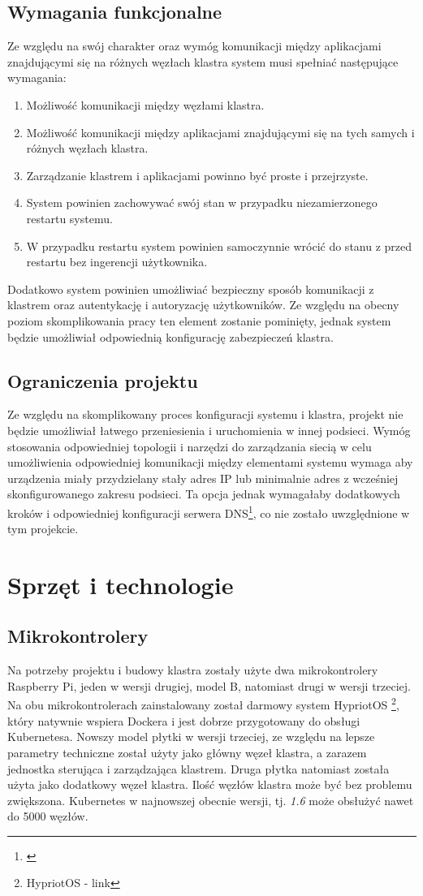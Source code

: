 \documentclass[12pt]{report}
\let\Oldsection\section
\renewcommand{\section}{\FloatBarrier\Oldsection}
\let\Oldsubsection\subsection
\renewcommand{\subsection}{\FloatBarrier\Oldsubsection}
\begin{document}
{\subsection{Wymagania funkcjonalne}
Ze względu na swój charakter oraz wymóg komunikacji między aplikacjami znajdującymi się na różnych węzłach klastra system musi spełniać następujące wymagania:

\begin{enumerate}
\item{Możliwość komunikacji między węzłami klastra.}
\item{Możliwość komunikacji między aplikacjami znajdującymi się na tych samych i różnych węzłach klastra.}
\item{Zarządzanie klastrem i aplikacjami powinno być proste i przejrzyste.}
\item{System powinien zachowywać swój stan w przypadku niezamierzonego restartu systemu.}
\item{W przypadku restartu system powinien samoczynnie wrócić do stanu z przed restartu bez ingerencji użytkownika.}
\end{enumerate}

Dodatkowo system powinien umożliwiać bezpieczny sposób komunikacji z klastrem oraz autentykację i autoryzację użytkowników. Ze względu na obecny poziom skomplikowania pracy ten element zostanie pominięty, jednak system będzie umożliwiał odpowiednią konfigurację zabezpieczeń klastra.
\subsection{Ograniczenia projektu}
Ze względu na skomplikowany proces konfiguracji systemu i klastra, projekt nie będzie umożliwiał łatwego przeniesienia i uruchomienia w innej podsieci. Wymóg stosowania odpowiedniej topologii i narzędzi do zarządzania siecią w celu umożliwienia odpowiedniej komunikacji między elementami systemu wymaga aby urządzenia miały przydzielany stały adres IP lub minimalnie adres z wcześniej skonfigurowanego zakresu podsieci. Ta opcja jednak wymagałaby dodatkowych kroków i odpowiedniej konfiguracji serwera DNS\footnote{\cite{dns}}, co nie zostało uwzględnione w tym projekcie.

\section{Sprzęt i technologie}
\subsection{Mikrokontrolery}
Na potrzeby projektu i budowy klastra zostały użyte dwa mikrokontrolery Raspberry Pi, jeden w wersji drugiej, model B, natomiast drugi w wersji trzeciej. Na obu mikrokontrolerach zainstalowany został darmowy system HypriotOS \footnote{HypriotOS - link}, który natywnie wspiera Dockera i jest dobrze przygotowany do obsługi Kubernetesa. Nowszy model płytki w wersji trzeciej, ze względu na lepsze parametry techniczne został użyty jako główny węzeł klastra, a zarazem jednostka sterująca i zarządzająca klastrem. Druga płytka natomiast została użyta jako dodatkowy węzeł klastra. Ilość węzłów klastra może być bez problemu zwiększona. Kubernetes w najnowszej obecnie wersji, tj. \textit{1.6} może obsłużyć nawet do 5000 węzłów. 
}
\end{document}
